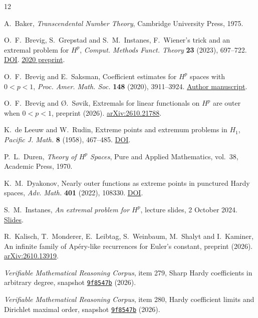 \documentclass[11pt]{article}
\numberwithin{equation}{section}
\theoremstyle{remark}
\begin{document}
\begin{thebibliography}{12}

A.~Baker, \emph{Transcendental Number Theory}, Cambridge University
Press, 1975.

O.~F.~Brevig, S.~Grepstad and S.~M.~Instanes,
F.~Wiener's trick and an extremal problem for \(H^p\),
\emph{Comput. Methods Funct. Theory} \textbf{23} (2023), 697--722.
\href{https://doi.org/10.1007/s40315-022-00469-x}{DOI}.
\href{https://arxiv.org/abs/2011.07790v1}{2020 preprint}.

O.~F.~Brevig and E.~Saksman,
Coefficient estimates for \(H^p\) spaces with \(0<p<1\),
\emph{Proc. Amer. Math. Soc.} \textbf{148} (2020), 3911--3924.
\href{https://arxiv.org/abs/1905.09547}{Author manuscript}.

O.~F.~Brevig and {\O}.~S{\o}vik,
Extremals for linear functionals on \(H^p\) are outer when \(0<p<1\),
preprint (2026).
\href{https://arxiv.org/abs/2610.21788}{arXiv:2610.21788}.

K.~de Leeuw and W.~Rudin,
Extreme points and extremum problems in \(H_1\),
\emph{Pacific J. Math.} \textbf{8} (1958), 467--485.
\href{https://doi.org/10.2140/pjm.1958.8.467}{DOI}.

P.~L.~Duren, \emph{Theory of \(H^p\) Spaces},
Pure and Applied Mathematics, vol.~38, Academic Press, 1970.

K.~M.~Dyakonov, Nearly outer functions as extreme points in punctured
Hardy spaces, \emph{Adv. Math.} \textbf{401} (2022), 108330.
\href{https://doi.org/10.1016/j.aim.2022.108330}{DOI}.

S.~M.~Instanes, \emph{An extremal problem for \(H^p\)},
lecture slides, 2 October 2024.
\href{https://verso.mat.uam.es/~dragan.vukotic/respub/sem_2024-10-02_Instanes-slides.pdf}{Slides}.

R.~Kalisch, T.~Monderer, E.~Leibtag, S.~Weinbaum, M.~Shalyt and
I.~Kaminer, An infinite family of Ap\'ery-like recurrences for Euler's
constant, preprint (2026).
\href{https://arxiv.org/abs/2610.13919}{arXiv:2610.13919}.

\emph{Verifiable Mathematical Reasoning Corpus}, item 279,
Sharp Hardy coefficients in arbitrary degree,
snapshot \href{https://github.com/QEEDDD/Verifiable-Mathematical-Reasoning-Corpus/tree/9f8547bfd3b8f6560f20c1b63028dc87a07a2e33}{\texttt{9f8547b}} (2026).

\emph{Verifiable Mathematical Reasoning Corpus}, item 280,
Hardy coefficient limits and Dirichlet maximal order,
snapshot \href{https://github.com/QEEDDD/Verifiable-Mathematical-Reasoning-Corpus/tree/9f8547bfd3b8f6560f20c1b63028dc87a07a2e33}{\texttt{9f8547b}} (2026).


\end{thebibliography}
\end{document}
